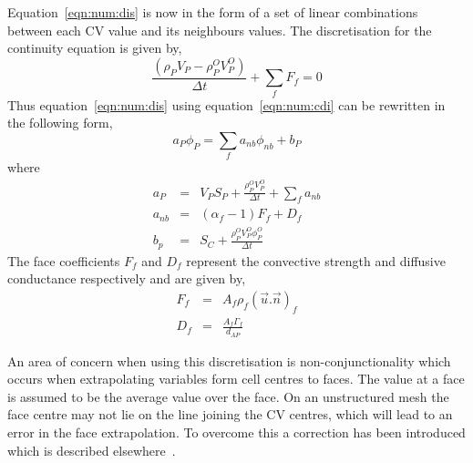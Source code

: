 Equation~\eqref{eqn:num:dis} is now in the form of a set of linear combinations between
each CV value and its neighbours values.
The discretisation for the continuity equation is given by,
\begin{equation}
\frac{(\rho_P V_P-\rho_P^O V_P^O)}{\Delta t}+\sum_f F_f = 0
\label{eqn:num:cdi}
\end{equation}
Thus equation~\eqref{eqn:num:dis} using equation~\eqref{eqn:num:cdi} can be rewritten
in the following form,
\begin{equation}
a_P \phi_P = \sum_f a_{nb} \phi_{nb} + b_P
\label{eqn:num:dap}
\end{equation}
where
\begin{eqnarray}
a_P & = & V_P S_P + \frac{\rho_P^O V_P^O}{\Delta t} + \sum_f a_{nb} \\
a_{nb} & = & ( \alpha_f - 1 ) F_f + D_f \\
b_p & = & S_C + \frac{\rho_P^O V_P^O \phi_P^O}{\Delta t} 
\end{eqnarray}
The face coefficients $F_f$ and $D_f$ represent the convective strength
and diffusive conductance respectively and are given by,
\begin{eqnarray}
F_f & = & A_f \rho_f ( \vec{u}.\vec{n} )_f \\
D_f & = & \frac{A_f \Gamma_f}{d_{AP}} 
\end{eqnarray}

An area of concern when using this discretisation is non-conjunctionality
which occurs when extrapolating variables form cell centres to faces.
The value at a face is assumed to be the average value over the face.
On an unstructured mesh the face centre may not lie on the line joining
the CV centres, which will lead to an error in the face extrapolation.
To overcome this a correction has been introduced which is described
elsewhere~\cite{croftphd}. 












